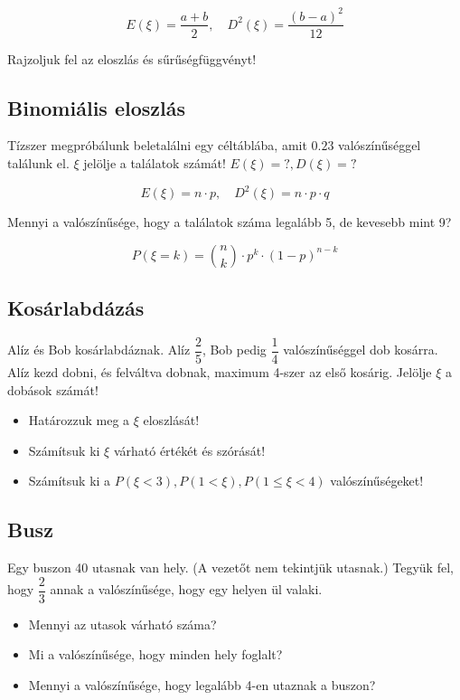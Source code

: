 \documentclass[a4paper]{article}
\begin{document}
\[
E(\xi) = \dfrac{a + b}{2}, \quad D^2(\xi) = \dfrac{(b - a)^2}{12}
\]

Rajzoljuk fel az eloszlás és sűrűségfüggvényt!

\subsection{Binomiális eloszlás}

Tízszer megpróbálunk beletalálni egy céltáblába, amit $0.23$ valószínűséggel találunk el.
$\xi$ jelölje a találatok számát! $E(\xi) = ?, D(\xi) = ?$

\[
E(\xi) = n \cdot p, \quad D^2(\xi) = n \cdot p \cdot q
\]

Mennyi a valószínűsége, hogy a találatok száma legalább 5, de kevesebb mint 9?

\[
P(\xi = k) = \binom{n}{k} \cdot p^k \cdot (1 - p)^{n - k}
\]

\subsection{Kosárlabdázás}

Alíz és Bob kosárlabdáznak.
Alíz $\dfrac{2}{5}$, Bob pedig $\dfrac{1}{4}$ valószínűséggel dob kosárra.
Alíz kezd dobni, és felváltva dobnak, maximum 4-szer az első kosárig.
Jelölje $\xi$ a dobások számát!

\begin{itemize}
\item Határozzuk meg a $\xi$ eloszlását!
\item Számítsuk ki $\xi$ várható értékét és szórását!
\item Számítsuk ki a $P(\xi < 3), P(1 < \xi), P(1 \leq \xi < 4)$ valószínűségeket!
\end{itemize}

\subsection{Busz}

Egy buszon 40 utasnak van hely.
(A vezetőt nem tekintjük utasnak.)
Tegyük fel, hogy $\dfrac{2}{3}$ annak a valószínűsége, hogy egy helyen ül valaki.

\begin{itemize}
\item Mennyi az utasok várható száma?
\item Mi a valószínűsége, hogy minden hely foglalt?
\item Mennyi a valószínűsége, hogy legalább 4-en utaznak a buszon?
\end{itemize}
\end{document}
